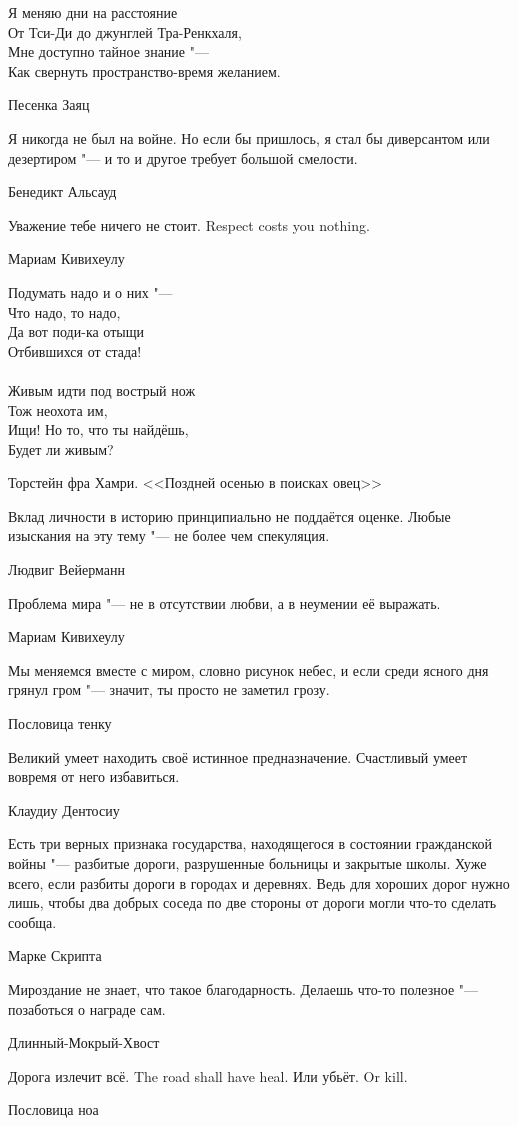 \epigraph
{Я меняю дни на расстояние\\
От Тси-Ди до джунглей Тра-Ренкхаля,\\
Мне доступно тайное знание "---\\
Как свернуть пространство-время желанием.}
{Песенка Заяц}

\epigraph
{Я никогда не был на войне.
Но если бы пришлось, я стал бы диверсантом или дезертиром "--- и то и другое требует большой смелости.}
{Бенедикт Альсауд}

\epigraph{
{Уважение тебе ничего не стоит.}
{Respect costs you nothing.}
}{Мариам Кивихеулу}

\epigraph
{Подумать надо и о них "---\\
Что надо, то надо,\\
Да вот поди-ка отыщи\\
Отбившихся от стада!\\
~\\
Живым идти под вострый нож\\
Тож неохота им,\\
Ищи! Но то, что ты найдёшь,\\
Будет ли живым?}
{Торстейн фра Хамри.
<<Поздней осенью в поисках овец>>}

\epigraph
{Вклад личности в историю принципиально не поддаётся оценке.
Любые изыскания на эту тему "--- не более чем спекуляция.}
{Людвиг Вейерманн}

\epigraph
{Проблема мира "--- не в отсутствии любви, а в неумении её выражать.}
{Мариам Кивихеулу}

\epigraph
{Мы меняемся вместе с миром, словно рисунок небес, и если среди ясного дня грянул гром "--- значит, ты просто не заметил грозу.}
{Пословица тенку}

\epigraph
{Великий умеет находить своё истинное предназначение.
Счастливый умеет вовремя от него избавиться.}
{Клаудиу Дентосиу}

\epigraph
{Есть три верных признака государства, находящегося в состоянии гражданской войны "--- разбитые дороги, разрушенные больницы и закрытые школы.
Хуже всего, если разбиты дороги в городах и деревнях.
Ведь для хороших дорог нужно лишь, чтобы два добрых соседа по две стороны от дороги могли что-то сделать сообща.}
{Марке Скрипта}

\epigraph
{Мироздание не знает, что такое благодарность.
Делаешь что-то полезное "--- позаботься о награде сам.}
{Длинный-Мокрый-Хвост}

\epigraph{
{Дорога излечит всё.}
{The road shall have heal.}
{Или убьёт.}
{Or kill.}
}{Пословица ноа}

